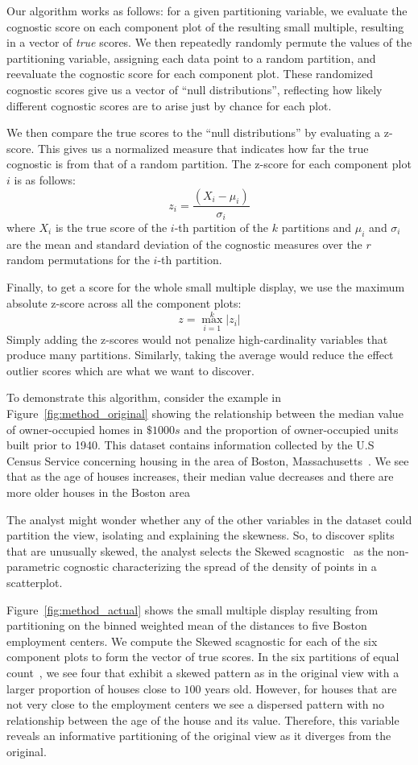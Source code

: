 Our algorithm works as follows: for a given partitioning variable, we evaluate the cognostic score on each component plot of the resulting small multiple, resulting in a vector of \emph{true} scores. We then repeatedly randomly permute the values of the partitioning variable, assigning each data point to a random partition, and reevaluate the cognostic score for each component plot. These randomized cognostic scores give us a vector of ``null distributions'', reflecting how likely different cognostic scores are to arise just by chance for each plot.

We then compare the true scores to the ``null distributions'' by evaluating a z-score. This gives us a normalized measure that indicates how far the true cognostic is from that of a random partition. The z-score for each component plot $i$ is as follows:
$$z_i = \frac{(X_i-\mu_i)}{\sigma_i}$$ 
where $X_i$ is the true score of the $i$-th partition of the $k$ partitions and $\mu_i$ and $\sigma_i$ are the mean and standard deviation of the cognostic measures over the $r$ random permutations for the $i$-th partition.

Finally, to get a score for the whole small multiple display, we use the maximum absolute z-score across all the component plots: 
$$z = \max_{i=1}^k |z_i|$$ 
Simply adding the z-scores would not penalize high-cardinality variables that produce many partitions. Similarly, taking the average would reduce the effect outlier scores which are what we want to discover.

To demonstrate this algorithm, consider the example in Figure~\ref{fig:method_original} showing the relationship between the median value of owner-occupied homes in $\$1000s$ and the proportion of owner-occupied units built prior to 1940. This dataset contains information collected by the U.S Census Service concerning housing in the area of Boston, Massachusetts~\cite{Harrison1978}. We see that as the age of houses increases, their median value decreases and there are more older houses in the Boston area

The analyst might wonder whether any of the other variables in the dataset could partition the view, isolating and explaining the skewness. So, to discover splits that are unusually skewed, the analyst selects the Skewed scagnostic~\cite{Wilkinson2005} as the non-parametric cognostic characterizing the spread of the density of points in a scatterplot. 

Figure~\ref{fig:method_actual} shows the small multiple display resulting from partitioning on the binned weighted mean of the distances to five Boston employment centers. We compute the Skewed scagnostic for each of the six component plots to form the vector of true scores. In the six partitions of equal count~\cite{Becker1996}, we see four that exhibit a skewed pattern as in the original view with a larger proportion of houses close to $100$ years old. However, for houses that are not very close to the employment centers we see a dispersed pattern with no relationship between the age of the house and its value. Therefore, this variable reveals an informative partitioning of the original view as it diverges from the original.

